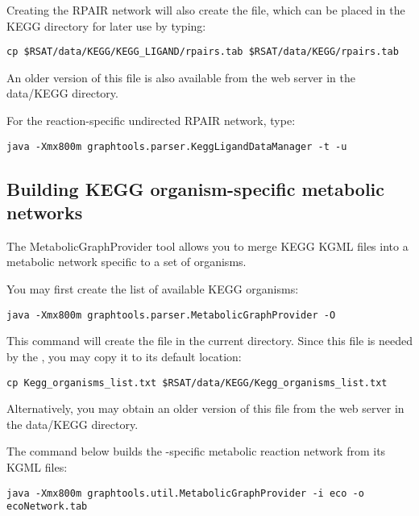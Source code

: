 Creating the RPAIR network will also create the  file, which
can be placed in the KEGG directory for later use by typing:

\begin{lstlisting}
cp $RSAT/data/KEGG/KEGG_LIGAND/rpairs.tab $RSAT/data/KEGG/rpairs.tab
\end{lstlisting}

An older version of this file is also available from the \neat web server
in the data/KEGG directory.

For the reaction-specific undirected RPAIR network, type:

\begin{verbatim}
java -Xmx800m graphtools.parser.KeggLigandDataManager -t -u
\end{verbatim}

\subsection{Building KEGG organism-specific metabolic networks}

The MetabolicGraphProvider tool allows you to merge KEGG KGML files into
a metabolic network specific to a set of organisms. 

You may first create the list of available KEGG organisms:

\begin{verbatim}
java -Xmx800m graphtools.parser.MetabolicGraphProvider -O
\end{verbatim}

This command will create the file  in the
current directory. Since this file is needed by the
, you may copy it to its default location:

\begin{lstlisting}
cp Kegg_organisms_list.txt $RSAT/data/KEGG/Kegg_organisms_list.txt
\end{lstlisting}

Alternatively, you may obtain an older version of this file from the \neat web
server in the data/KEGG directory. 


The command below builds the -specific metabolic reaction network
from its KGML files:

\begin{verbatim}
java -Xmx800m graphtools.util.MetabolicGraphProvider -i eco -o ecoNetwork.tab
\end{verbatim}

